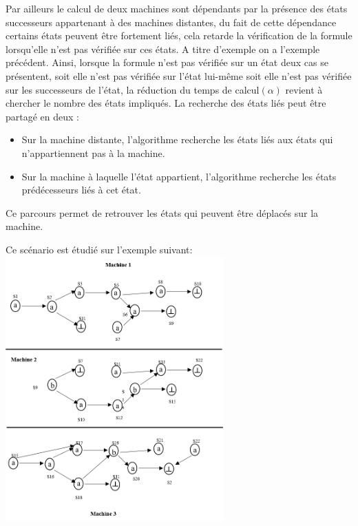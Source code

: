 Par ailleurs le calcul de deux machines sont d\'{e}pendants par la présence des états successeurs  appartenant à des machines distantes, du fait de cette d\'{e}pendance certains \'{e}tats peuvent \^{e}tre fortement li\'{e}s, cela retarde la v\'{e}rification de la formule lorsqu'elle n'est pas vérifiée sur ces \'{e}tats. A titre d'exemple on a l'exemple précédent. Ainsi, lorsque la formule n'est pas vérifiée sur un \'{e}tat deux cas se présentent, soit elle n'est pas vérifiée sur l’\'{e}tat lui-m\^{e}me soit elle n'est pas vérifiée sur les successeurs de l'état, la réduction du temps de calcul$(\alpha)$ revient \`{a} chercher le nombre des \'{e}tats impliqu\'{e}s. La recherche des \'{e}tats liés peut \^{e}tre partagé en deux : 
\begin{itemize}
\item Sur la machine distante, l'algorithme recherche les états liés aux états qui n'appartiennent pas à la machine.
\item Sur la machine à laquelle l'état appartient, l'algorithme recherche les \'{e}tats pr\'{e}d\'{e}cesseurs liés à cet état. 
\end{itemize}
Ce parcours permet de retrouver les états qui peuvent être d\'{e}placés sur la machine. 


\begin{Exemple} 
Ce sc\'{e}nario est étudié sur l’exemple suivant:
   \centering
	\includegraphics[height=4in]{img/skd2.png}	
	 \label{skd2}

\end{Exemple}